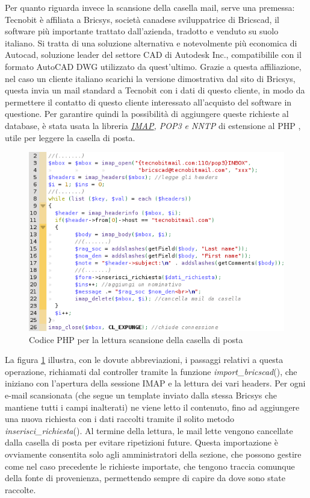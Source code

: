\noindent
Per quanto riguarda invece la scansione della casella mail, serve una premessa: Tecnobit \`e affiliata a Bricsys\textregistered, societ\`a canadese sviluppatrice di Bricscad, il software pi\`u importante trattato dall'azienda, tradotto e venduto su suolo italiano. Si tratta di una soluzione alternativa e notevolmente pi\`u economica di Autocad\textregistered, soluzione leader del settore CAD di Autodesk Inc., compatibilile con il formato AutoCAD DWG utilizzato da quest'ultimo. Grazie a questa affiliazione, nel caso un cliente italiano scarichi la versione dimostrativa dal sito di Bricsys\textregistered, questa invia un mail standard a Tecnobit con i dati di questo cliente, in modo da permettere il contatto di questo cliente interessato all'acquisto del software in questione.
Per garantire quindi la possibilit\`a di aggiungere queste richieste al database, \`e stata usata la libreria \textit{\hyperlink{imap}{\underline{IMAP}}, POP3 e NNTP} di estensione al PHP \cite{quattro}, utile per leggere la casella di posta.
\newpage

\begin{figure}[!ht]
\centering
  \includegraphics[scale=0.8]{./images/codicebrics.png}
\caption{Codice PHP per la lettura scansione della casella di posta}
\label{bricscode}
\end{figure}

\noindent La figura \ref{bricscode} illustra, con le dovute abbreviazioni, i passaggi relativi a questa operazione, richiamati dal controller tramite la funzione \textit{import\_bricscad}(), che iniziano con l'apertura della sessione IMAP e la lettura dei vari headers. Per ogni e-mail scansionata (che segue un template inviato dalla stessa Bricsys che mantiene tutti i campi inalterati) ne viene letto il contenuto, fino ad aggiungere una nuova richiesta con i dati raccolti tramite il solito metodo \textit{inserisci\_richiesta}(). Al termine della lettura, le mail lette vengono cancellate dalla casella di posta per evitare ripetizioni future.
Questa importazione \`e ovviamente consentita solo agli amministratori della sezione, che possono gestire come nel caso precedente le richieste importate, che tengono traccia comunque della fonte di provenienza, permettendo sempre di capire da dove sono state raccolte.

